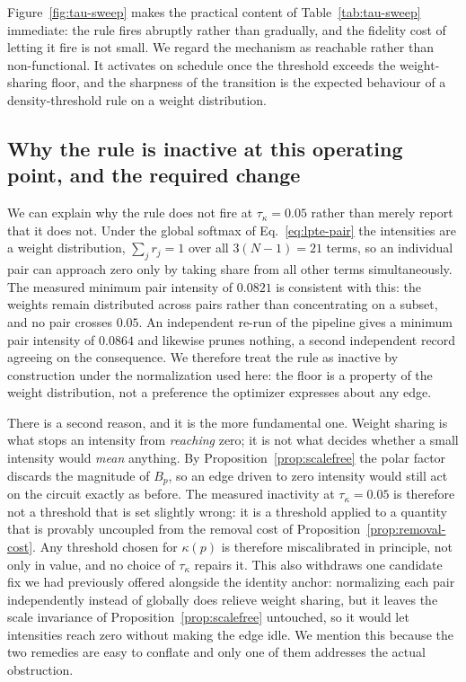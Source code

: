 \documentclass[twocolumn,aps,prl,superscriptaddress,showkeys]{revtex4-2}
\theoremstyle{plain}
\theoremstyle{definition}
\begin{document}
Figure~\ref{fig:tau-sweep} makes the practical content of Table~\ref{tab:tau-sweep} immediate: the rule fires abruptly rather than gradually, and the fidelity cost of letting it fire is not small. We regard the mechanism as reachable rather than non-functional. It activates on schedule once the threshold exceeds the weight-sharing floor, and the sharpness of the transition is the expected behaviour of a density-threshold rule on a weight distribution.

\subsection{Why the rule is inactive at this operating point, and the required change}

We can explain why the rule does not fire at $\tau_\kappa=0.05$ rather than merely report that it does not. Under the global softmax of Eq.~\eqref{eq:lpte-pair} the intensities are a weight distribution, $\sum_j r_j=1$ over all $3(N-1)=21$ terms, so an individual pair can approach zero only by taking share from all other terms simultaneously. The measured minimum pair intensity of $0.0821$ is consistent with this: the weights remain distributed across pairs rather than concentrating on a subset, and no pair crosses $0.05$. An independent re-run of the pipeline gives a minimum pair intensity of $0.0864$ and likewise prunes nothing, a second independent record agreeing on the consequence. We therefore treat the rule as inactive by construction under the normalization used here: the floor is a property of the weight distribution, not a preference the optimizer expresses about any edge.

There is a second reason, and it is the more fundamental one. Weight sharing is what stops an intensity from \emph{reaching} zero; it is not what decides whether a small intensity would \emph{mean} anything. By Proposition~\ref{prop:scalefree} the polar factor discards the magnitude of $B_p$, so an edge driven to zero intensity would still act on the circuit exactly as before. The measured inactivity at $\tau_\kappa=0.05$ is therefore not a threshold that is set slightly wrong: it is a threshold applied to a quantity that is provably uncoupled from the removal cost of Proposition~\ref{prop:removal-cost}. Any threshold chosen for $\kappa(p)$ is therefore miscalibrated in principle, not only in value, and no choice of $\tau_\kappa$ repairs it. This also withdraws one candidate fix we had previously offered alongside the identity anchor: normalizing each pair independently instead of globally does relieve weight sharing, but it leaves the scale invariance of Proposition~\ref{prop:scalefree} untouched, so it would let intensities reach zero without making the edge idle. We mention this because the two remedies are easy to conflate and only one of them addresses the actual obstruction.
\end{document}
